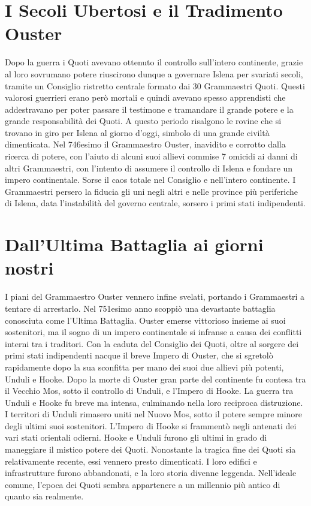 \documentclass[10pt, a4paper]{report}
\begin{document}
\begin{multicols}{2}
\section*{I Secoli Ubertosi e il Tradimento Ouster}
Dopo la guerra i Quoti avevano ottenuto il controllo sull’intero continente, grazie al loro sovrumano potere riuscirono dunque a governare Islena per svariati secoli, tramite un Consiglio ristretto centrale formato dai 30 Grammaestri Quoti. Questi valorosi guerrieri erano però mortali e quindi avevano spesso apprendisti che addestravano per poter passare il testimone e tramandare il grande potere e la grande responsabilità dei Quoti. A questo periodo risalgono le rovine che si trovano in giro per Islena al giorno d’oggi, simbolo di una grande civiltà dimenticata. Nel 746esimo il Grammaestro Ouster, inavidito e corrotto dalla ricerca di potere, con l’aiuto di alcuni suoi allievi commise 7 omicidi ai danni di altri Grammaestri, con l’intento di assumere il controllo di Islena e fondare un impero continentale. Sorse il caos totale nel Consiglio e nell’intero continente. I Grammaestri persero la fiducia gli uni negli altri e nelle province più periferiche di Islena, data l’instabilità del governo centrale, sorsero i primi stati indipendenti.
\section*{Dall'Ultima Battaglia ai giorni nostri}
I piani del Grammaestro Ouster vennero infine svelati, portando i Grammaestri a tentare di arrestarlo. Nel 751esimo anno scoppiò una devastante battaglia conosciuta come l'Ultima Battaglia. Ouster emerse vittorioso insieme ai suoi sostenitori, ma il sogno di un impero continentale si infranse a causa dei conflitti interni tra i traditori.
Con la caduta del Consiglio dei Quoti, oltre al sorgere dei primi stati indipendenti nacque il breve Impero di Ouster, che si sgretolò rapidamente dopo la sua sconfitta per mano dei suoi due allievi più potenti, Unduli e Hooke. Dopo la morte di Ouster gran parte del continente fu contesa tra il Vecchio Mos, sotto il controllo di Unduli, e l'Impero di Hooke.
La guerra tra Unduli e Hooke fu breve ma intensa, culminando nella loro reciproca distruzione. I territori di Unduli rimasero uniti nel Nuovo Mos, sotto il potere sempre minore degli ultimi suoi sostenitori. L'Impero di Hooke si frammentò negli antenati dei vari stati orientali odierni.
Hooke e Unduli furono gli ultimi in grado di maneggiare il mistico potere dei Quoti.
Nonostante la tragica fine dei Quoti sia relativamente recente, essi vennero presto dimenticati. I loro edifici e infrastrutture furono abbandonati, e la loro storia divenne leggenda. Nell'ideale comune, l'epoca dei Quoti sembra appartenere a un millennio più antico di quanto sia realmente.


\end{multicols}
\end{document}
